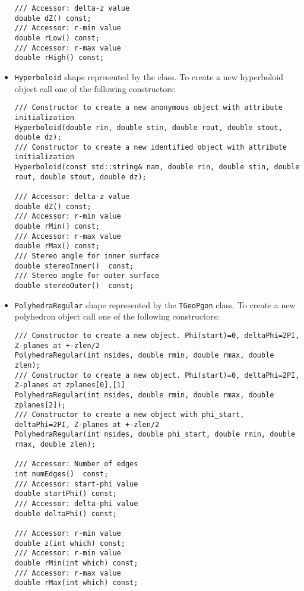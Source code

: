 \begin{itemize}
\begin{verbatim}
/// Accessor: delta-z value
double dZ() const;
/// Accessor: r-min value
double rLow() const;
/// Accessor: r-max value
double rHigh() const;
\end{verbatim}

\item \texttt{Hyperboloid}  shape represented by the  class. To create a new hyperboloid object call one of the following constructors:
\begin{verbatim}
/// Constructor to create a new anonymous object with attribute initialization
Hyperboloid(double rin, double stin, double rout, double stout, double dz);
/// Constructor to create a new identified object with attribute initialization
Hyperboloid(const std::string& nam, double rin, double stin, double rout, double stout, double dz);

/// Accessor: delta-z value
double dZ() const;
/// Accessor: r-min value
double rMin() const;
/// Accessor: r-max value
double rMax() const;
/// Stereo angle for inner surface
double stereoInner()  const;
/// Stereo angle for outer surface
double stereoOuter()  const;
\end{verbatim}

\item \texttt{PolyhedraRegular} shape represented by the \texttt{TGeoPgon} class. To create a new polyhedron object call one of the following constructors:
\begin{verbatim}
/// Constructor to create a new object. Phi(start)=0, deltaPhi=2PI, Z-planes at +-zlen/2
PolyhedraRegular(int nsides, double rmin, double rmax, double zlen);
/// Constructor to create a new object. Phi(start)=0, deltaPhi=2PI, Z-planes at zplanes[0],[1]
PolyhedraRegular(int nsides, double rmin, double rmax, double zplanes[2]);
/// Constructor to create a new object with phi_start, deltaPhi=2PI, Z-planes at +-zlen/2
PolyhedraRegular(int nsides, double phi_start, double rmin, double rmax, double zlen);

/// Accessor: Number of edges
int numEdges()  const;
/// Accessor: start-phi value
double startPhi() const;
/// Accessor: delta-phi value
double deltaPhi() const;

/// Accessor: r-min value
double z(int which) const;
/// Accessor: r-min value
double rMin(int which) const;
/// Accessor: r-max value
double rMax(int which) const;


\end{verbatim}
\end{itemize}
